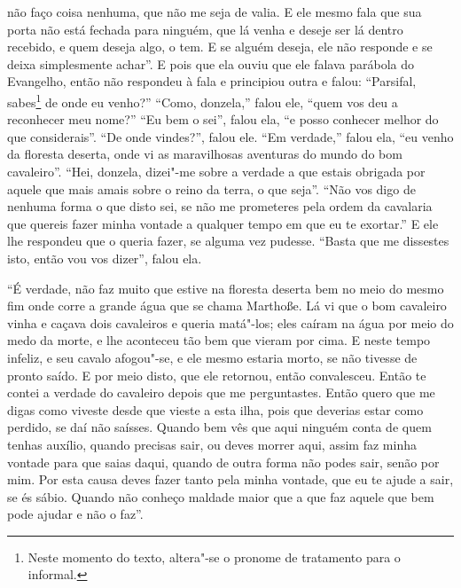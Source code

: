 não faço coisa nenhuma, que não me seja de valia. E ele mesmo fala que sua
porta não está fechada para ninguém, que lá venha e deseje ser lá dentro
recebido, e quem deseja algo, o tem. E se alguém deseja, ele não responde e se
deixa simplesmente achar”. E pois que ela ouviu que ele falava
parábola do Evangelho, então não respondeu à fala e principiou outra e falou:
“Parsifal, sabes\footnote{ Neste momento do texto, altera"-se o pronome de
tratamento para o informal.}  de onde eu venho?” “Como, donzela,”
falou ele, “quem vos deu a reconhecer meu nome?” “Eu bem o sei”, falou ela, “e
posso conhecer melhor do que considerais”. “De onde vindes?”, falou ele. “Em
verdade,” falou ela, “eu venho da floresta deserta, onde vi as maravilhosas
aventuras do mundo do bom cavaleiro”. “Hei, donzela, dizei"-me sobre a verdade a
que estais obrigada por aquele que mais amais sobre o reino da terra, o que
seja”. “Não vos digo de nenhuma forma o que disto sei, se não me prometeres
pela ordem da cavalaria que quereis fazer minha vontade a qualquer tempo em que
eu te exortar.” E ele lhe respondeu que o queria fazer, se alguma vez pudesse.
“Basta que me dissestes isto, então vou vos dizer”, falou ela.

“É verdade, não faz muito que estive na floresta deserta bem no meio do
mesmo fim onde corre a grande água que se chama Marthoße. Lá vi que o bom
cavaleiro vinha e caçava dois cavaleiros e queria matá"-los; eles caíram na água
por meio do medo da morte, e lhe aconteceu tão bem que vieram por cima. E neste
tempo infeliz, e seu cavalo afogou"-se, e ele mesmo estaria morto, se não
tivesse de pronto saído. E por meio disto, que ele retornou, então convalesceu.
Então te contei a verdade do cavaleiro depois que me perguntastes. Então quero
que me digas como viveste desde que vieste a esta ilha, pois que deverias estar
como perdido, se daí não saísses. Quando bem vês que aqui ninguém conta de quem
tenhas auxílio, quando precisas sair, ou deves morrer aqui, assim faz minha
vontade para que saias daqui, quando de outra forma não podes sair, senão por
mim. Por esta causa deves fazer tanto pela minha vontade, que eu te ajude a
sair, se és sábio. Quando não conheço maldade maior que a que faz aquele que
bem pode ajudar e não o faz”.

